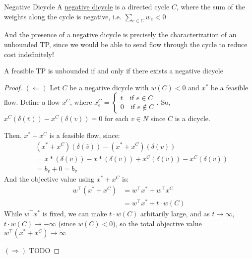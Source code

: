\begin{definition}{Negative Dicycle}{}
  A \underline{negative dicycle} is a directed cycle $C$, where the sum of the weights along the cycle is negative, i.e. $\sum_{e \in C} w_e < 0$
\end{definition}

And the presence of a negative dicycle is precisely the characterization of an unbounded TP, since we would be able to send flow through the cycle to reduce cost indefinitely!

\begin{theorem}{}{}
  A feasible TP is unbounded if and only if there exists a negative dicycle
\end{theorem}
\begin{proof}
$(\Leftarrow)$ Let $C$ be a negative dicycle with $w(C) < 0$ and $x^*$ be a feasible flow.
Define a flow $x^C$, where $x^C_e = \begin{cases} 
t \quad \text{if } e \in C \\ 
0 \quad \text{if } e \not\in C
\end{cases}$.
So, $x^C(\delta(\bar{v})) - x^C(\delta(v)) = 0$ for each $v \in N$ since $C$ is a dicycle.

Then, $x^* + x^C$ is a feasible flow, since:
\begin{align*}
  &(x^* + x^C)(\delta(\bar{v})) - (x^* + x^C)(\delta(v)) \\ 
  &=x*(\delta(\bar{v})) - x*(\delta(v)) + x^C(\delta(\bar{v})) - x^C(\delta(v)) \\ 
  & = b_v + 0 = b_v
\end{align*}
And the objective value using $x^* + x^C$ is:
\begin{align*}
  w^\intercal(x^* + x^C) &= w^\intercal x^* + w^\intercal x^C \\
  &= w^\intercal x^* + t \cdot w(C)
\end{align*}
While $w^\intercal x^*$ is fixed, we can make $t \cdot w(C)$ arbitarily large, and as $t \longrightarrow \infty$, $t \cdot w(C) \longrightarrow -\infty$ (since $w(C) < 0$), so the total objective value $w^\intercal(x^* + x^C) \longrightarrow \infty$

$(\Rightarrow)$ TODO
\end{proof}

